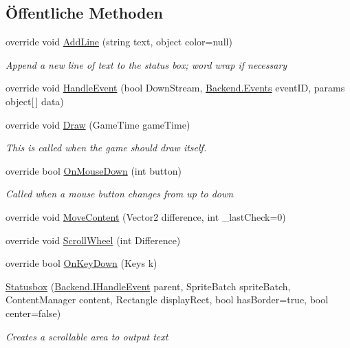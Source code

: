 \subsection*{Öffentliche Methoden}
\begin{DoxyCompactItemize}
\item 
override void \hyperlink{class_gruppe22_1_1_client_1_1_statusbox_a5b23e66c24de79d0a274577d63a6ad74}{Add\-Line} (string text, object color=null)
\begin{DoxyCompactList}\small\item\em Append a new line of text to the status box; word wrap if necessary \end{DoxyCompactList}\item 
override void \hyperlink{class_gruppe22_1_1_client_1_1_statusbox_a545d945221658c0c1b348c5fd4b26a69}{Handle\-Event} (bool Down\-Stream, \hyperlink{namespace_gruppe22_1_1_backend_ab56df91bb0bdafa1ea978e552209ce73}{Backend.\-Events} event\-I\-D, params object\mbox{[}$\,$\mbox{]} data)
\item 
override void \hyperlink{class_gruppe22_1_1_client_1_1_statusbox_aa7965174de723d0fc0e8a8f7bbc3be85}{Draw} (Game\-Time game\-Time)
\begin{DoxyCompactList}\small\item\em This is called when the game should draw itself. \end{DoxyCompactList}\item 
override bool \hyperlink{class_gruppe22_1_1_client_1_1_statusbox_ab8eaff6863d543e251756c0954fe193d}{On\-Mouse\-Down} (int button)
\begin{DoxyCompactList}\small\item\em Called when a mouse button changes from up to down \end{DoxyCompactList}\item 
override void \hyperlink{class_gruppe22_1_1_client_1_1_statusbox_a4945809df0ff23018b197049abd420a0}{Move\-Content} (Vector2 difference, int \-\_\-last\-Check=0)
\item 
override void \hyperlink{class_gruppe22_1_1_client_1_1_statusbox_aefcb1642cf6576b9efcdcaaa64f6a879}{Scroll\-Wheel} (int Difference)
\item 
override bool \hyperlink{class_gruppe22_1_1_client_1_1_statusbox_a92512ba8bfcfeb6c417eedf5f1b3634e}{On\-Key\-Down} (Keys k)
\item 
\hyperlink{class_gruppe22_1_1_client_1_1_statusbox_af6dd356420111c04c1110e770ed98727}{Statusbox} (\hyperlink{interface_gruppe22_1_1_backend_1_1_i_handle_event}{Backend.\-I\-Handle\-Event} parent, Sprite\-Batch sprite\-Batch, Content\-Manager content, Rectangle display\-Rect, bool has\-Border=true, bool center=false)
\begin{DoxyCompactList}\small\item\em Creates a scrollable area to output text \end{DoxyCompactList}\end{DoxyCompactItemize}
